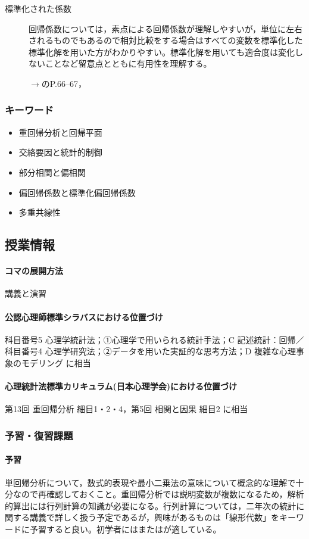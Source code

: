 \begin{description}
	\item[標準化された係数] 回帰係数については，素点による回帰係数が理解しやすいが，単位に左右されるものでもあるので相対比較をする場合はすべての変数を標準化した標準化解を用いた方がわかりやすい。標準化解を用いても適合度は変化しないことなど留意点とともに有用性を理解する。
	      \begin{flushright}
		      $\to$\textcite{kosugi2018}のP.66--67，
	      \end{flushright}

\end{description}
\subsubsection{キーワード}
\begin{itemize}
	\item 重回帰分析と回帰平面
	\item 交絡要因と統計的制御
	\item 部分相関と偏相関
	\item 偏回帰係数と標準化偏回帰係数
	\item 多重共線性
\end{itemize}
\subsection{授業情報}
\paragraph{コマの展開方法}
講義と演習
\paragraph{公認心理師標準シラバスにおける位置づけ}
科目番号5 心理学統計法；①心理学で用いられる統計手法；C 記述統計：回帰／科目番号4 心理学研究法；②データを用いた実証的な思考方法；D 複雑な心理事象のモデリング に相当
\paragraph{心理統計法標準カリキュラム(日本心理学会)における位置づけ}
第13回 重回帰分析 細目1・2・4，第5回 相関と因果 細目2 に相当
\subsubsection{予習・復習課題}
\paragraph{予習}
単回帰分析について，数式的表現や最小二乗法の意味について概念的な理解で十分なので再確認しておくこと。重回帰分析では説明変数が複数になるため，解析的算出には行列計算の知識が必要になる。行列計算については，二年次の統計に関する講義で詳しく扱う予定であるが，興味があるものは「線形代数」をキーワードに予習すると良い。初学者には\textcite{Yuki201810}または\textcite{Okada200804}が適している。
